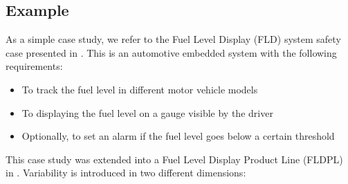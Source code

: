 \documentclass[11pt]{article}
\begin{document}
%
%
%
%
%
%
%
%

\subsection{Example}

As a simple case study, we refer to the Fuel Level Display (FLD) system safety case presented in \cite{Dardar_2014}. This is an automotive embedded system with the following requirements:

\begin{itemize}
 \item To track the fuel level in different motor vehicle models
 \item To displaying the fuel level on a gauge visible by the driver
 \item Optionally, to set an alarm if the fuel level goes below a certain threshold 
 \end{itemize}
 
 This case study was extended into a Fuel Level Display Product Line (FLDPL) in \cite{Gallucci_2013}. Variability is introduced in two different dimensions:
 
\end{document}
